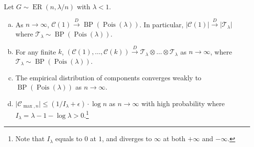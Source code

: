 \begin{lemma}\label{lma:component-of-subcritical-Erdős-Rényi-graph}
	Let \(G \sim \operatorname{ER}(n, \lambda / n) \) with \(\lambda < 1\).
	\begin{enumerate}[(a)]
		\item\label{lma:component-of-subcritical-Erdős-Rényi-graph-a} As \(n\to \infty \), \(\mathcal{C} (1) \overset{D}{\to} \operatorname{BP}(\operatorname{Pois}(\lambda ) ) \). In particular, \(\lvert \mathcal{C} (1) \rvert \overset{D}{\to} \lvert \mathcal{T} _\lambda  \rvert \) where \(\mathcal{T} _\lambda \sim \operatorname{BP}(\operatorname{Pois}(\lambda ) )\).
		\item\label{lma:component-of-subcritical-Erdős-Rényi-graph-b} For any finite \(k\), \((\mathcal{C} (1), \dots , \mathcal{C} (k)) \overset{D}{\to} \mathcal{T} _\lambda \otimes \dots \otimes \mathcal{T} _\lambda \) as \(n\to \infty \), where \(\mathcal{T} _\lambda \sim \operatorname{BP}(\operatorname{Pois}(\lambda ) )\).
		\item\label{lma:component-of-subcritical-Erdős-Rényi-graph-c} The empirical distribution of components converges weakly to \(\operatorname{BP}(\operatorname{Pois}(\lambda ) ) \) as \(n\to \infty \).
		\item\label{lma:component-of-subcritical-Erdős-Rényi-graph-d} \(\lvert \mathcal{C} _{\max , n} \rvert \leq (1 / I_\lambda + \epsilon ) \cdot \log n\) as \(n\to \infty \) with high probability where \(I_\lambda = \lambda - 1 - \log \lambda > 0\).\footnote{Note that \(I_\lambda \) equals to \(0\) at \(1\), and diverges to \(\infty \) at both \(+\infty \) and \(-\infty \).}
	\end{enumerate}
\end{lemma}

